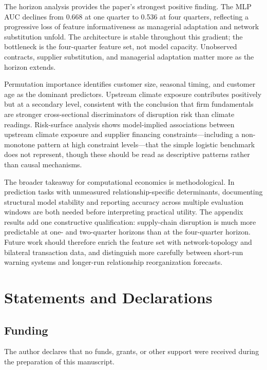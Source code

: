 \documentclass[12pt]{article}
\begin{document}
The horizon analysis provides the paper's strongest positive finding.
The MLP AUC declines from 0.668 at one quarter to 0.536 at four quarters,
reflecting a progressive loss of feature informativeness as managerial
adaptation and network substitution unfold.  The architecture is stable
throughout this gradient; the bottleneck is the four-quarter feature set,
not model capacity.  Unobserved contracts, supplier substitution, and
managerial adaptation matter more as the horizon extends.

Permutation importance identifies customer size, seasonal timing, and
customer age as the dominant predictors.  Upstream climate exposure
contributes positively but at a secondary level, consistent with the
conclusion that firm fundamentals are stronger cross-sectional discriminators
of disruption risk than climate readings.  Risk-surface analysis shows
model-implied associations between upstream climate exposure and supplier
financing constraints---including a non-monotone pattern at high constraint
levels---that the simple logistic benchmark does not represent, though these
should be read as descriptive patterns rather than causal mechanisms.

The broader takeaway for computational economics is methodological.  In
prediction tasks with unmeasured relationship-specific determinants,
documenting structural model stability and reporting accuracy across multiple
evaluation windows are both needed before interpreting practical utility.
The appendix results add one constructive qualification: supply-chain
disruption is much more predictable at one- and two-quarter horizons than at
the four-quarter horizon.  Future work should therefore enrich the feature set
with network-topology and bilateral transaction data, and distinguish more
carefully between short-run warning systems and longer-run relationship
reorganization forecasts.


\section*{Statements and Declarations}

\subsection*{Funding}
The author declares that no funds, grants, or other support were received
during the preparation of this manuscript.
\end{document}
